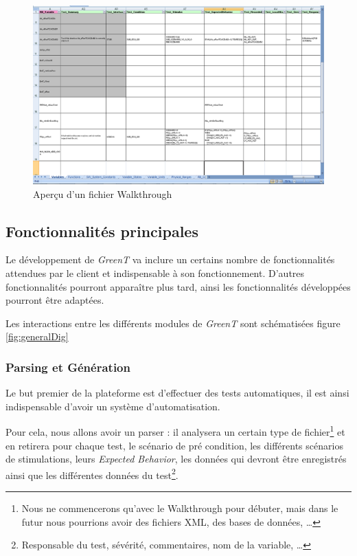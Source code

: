 		\begin{figure}[H]
			\centering
			\includegraphics[width=18.5cm]{contents/images/walkthrough.png}
			\caption{Aperçu d'un fichier Walkthrough}
		\end{figure}

	\subsection{Fonctionnalités principales}
	Le développement de \textit{GreenT} va inclure un certains nombre de fonctionnalités attendues par le client et indispensable à son fonctionnement. D'autres fonctionnalités pourront apparaître plus tard, ainsi les fonctionnalités développées pourront être adaptées.

	Les interactions entre les différents modules de \textit{GreenT} sont schématisées figure \ref{fig:generalDig}

	\subsubsection{Parsing et Génération}\label{generation}
	Le but premier de la plateforme est d'effectuer des tests automatiques, il est ainsi indispensable d'avoir un système d'automatisation.

	Pour cela, nous allons avoir un parser : il analysera un certain type de fichier\footnote{Nous ne commencerons qu'avec le Walkthrough pour débuter, mais dans le futur nous pourrions avoir des fichiers XML, des bases de données, \ldots} et en retirera pour chaque test, le scénario de pré condition, les différents scénarios de stimulations, leurs \textit{Expected Behavior}, les données qui devront être enregistrés ainsi que les différentes données du test\footnote{Responsable du test, sévérité, commentaires, nom de la variable, \ldots}.

